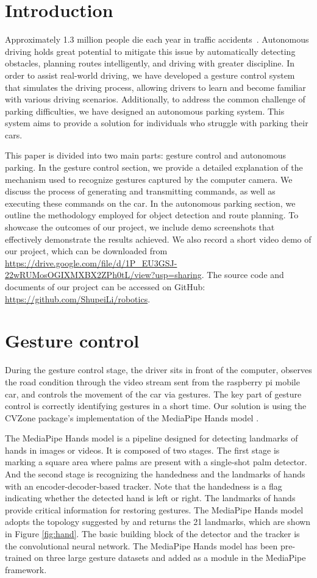 \documentclass[acmsmall]{acmart}
\begin{document}
\section{Introduction}
Approximately 1.3 million people die each year in traffic accidents~\cite{who-road-traffic-injuries}. Autonomous driving holds great potential to mitigate this issue by automatically detecting obstacles, planning routes intelligently, and driving with greater discipline. In order to assist real-world driving, we have developed a gesture control system that simulates the driving process, allowing drivers to learn and become familiar with various driving scenarios. Additionally, to address the common challenge of parking difficulties, we have designed an autonomous parking system. This system aims to provide a solution for individuals who struggle with parking their cars.

This paper is divided into two main parts: gesture control and autonomous parking. In the gesture control section, we provide a detailed explanation of the mechanism used to recognize gestures captured by the computer camera. We discuss the process of generating and transmitting commands, as well as executing these commands on the car. In the autonomous parking section, we outline the methodology employed for object detection and route planning. To showcase the outcomes of our project, we include demo screenshots that effectively demonstrate the results achieved. We also record a short video demo of our project, which can be downloaded from \url{https://drive.google.com/file/d/1P_EU3GSJ-22wRUMosOGIXMXBX2ZPh0tL/view?usp=sharing}. The source code and documents of our project can be accessed on GitHub: \url{https://github.com/ShupeiLi/robotics}.

\section{Gesture control}
During the gesture control stage, the driver sits in front of the computer, observes the road condition through the video stream sent from the raspberry pi mobile car, and controls the movement of the car via gestures. The key part of gesture control is correctly identifying gestures in a short time. Our solution is using the CVZone package's implementation of the MediaPipe Hands model \cite{cvzone}.

The MediaPipe Hands model is a pipeline designed for detecting landmarks of hands in images or videos. It is composed of two stages. The first stage is marking a square area where palms are present with a single-shot palm detector. And the second stage is recognizing the handedness and the landmarks of hands with an encoder-decoder-based tracker. Note that the handedness is a flag indicating whether the detected hand is left or right. The landmarks of hands provide critical information for restoring gestures. The MediaPipe Hands model adopts the topology suggested by \cite{hand} and returns the 21 landmarks, which are shown in Figure \ref{fig:hand}. The basic building block of the detector and the tracker is the convolutional neural network. The MediaPipe Hands model has been pre-trained on three large gesture datasets and added as a module in the MediaPipe framework.
\end{document}
